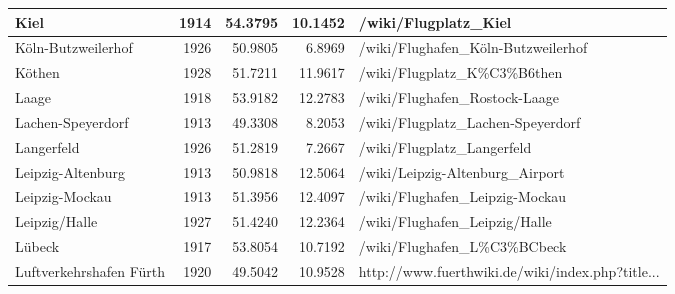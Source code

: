 \begin{table}[h!]
{\begin{tabular}{p{2.8cm}rrrp{6cm}}
  Kiel & 1914 & 54.3795 & 10.1452 & /wiki/Flugplatz\_Kiel \\ 
   \midrule
K\"oln-Butzweilerhof & 1926 & 50.9805 & 6.8969 & /wiki/Flughafen\_K\"oln-Butzweilerhof \\ 
  K\"othen & 1928 & 51.7211 & 11.9617 & /wiki/Flugplatz\_K\%C3\%B6then \\ 
  Laage & 1918 & 53.9182 & 12.2783 & /wiki/Flughafen\_Rostock-Laage \\ 
  Lachen-Speyerdorf & 1913 & 49.3308 & 8.2053 & /wiki/Flugplatz\_Lachen-Speyerdorf \\ 
  Langerfeld & 1926 & 51.2819 & 7.2667 & /wiki/Flugplatz\_Langerfeld \\ 
  Leipzig-Altenburg & 1913 & 50.9818 & 12.5064 & /wiki/Leipzig-Altenburg\_Airport \\ 
  Leipzig-Mockau & 1913 & 51.3956 & 12.4097 & /wiki/Flughafen\_Leipzig-Mockau \\ 
  Leipzig/Halle  & 1927 & 51.4240 & 12.2364 & /wiki/Flughafen\_Leipzig/Halle \\ 
  L\"ubeck & 1917 & 53.8054 & 10.7192 & /wiki/Flughafen\_L\%C3\%BCbeck \\ 
  Luftverkehrshafen F\"urth & 1920 & 49.5042 & 10.9528 & http://www.fuerthwiki.de/wiki/index.php?title... \\ 
   \bottomrule 
 \end{tabular}
 } 
 \end{table} 

